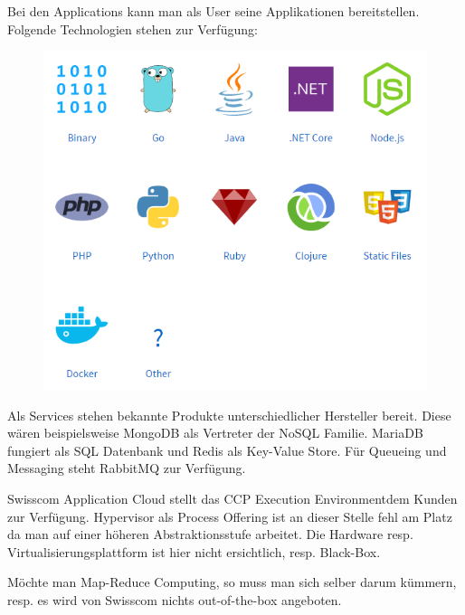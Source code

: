 Bei den Applications kann man als User seine Applikationen bereitstellen. Folgende Technologien stehen zur Verfügung:
\begin{figure}[H]
\centering
\includegraphics[scale=0.5]{images/applications.png}
\end{figure}
Als Services stehen bekannte Produkte unterschiedlicher Hersteller bereit. Diese wären beispielsweise MongoDB als Vertreter der NoSQL Familie. MariaDB fungiert als SQL Datenbank und Redis als Key-Value Store. Für Queueing und Messaging steht RabbitMQ zur Verfügung. 

Swisscom Application Cloud stellt das CCP \glqq Execution Environment\grqq dem Kunden zur Verfügung. Hypervisor als Process Offering ist an dieser Stelle fehl am Platz da man auf einer höheren Abstraktionsstufe arbeitet. Die Hardware resp. Virtualisierungsplattform ist hier nicht ersichtlich, resp. Black-Box. 

Möchte man Map-Reduce Computing, so muss man sich selber darum kümmern, resp. es wird von Swisscom nichts out-of-the-box angeboten.


